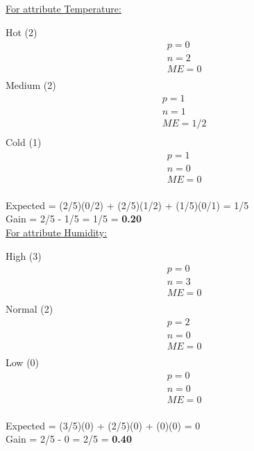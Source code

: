 \documentclass[8pt, fullpage,letterpaper]{article}
\begin{document}
\begin{enumerate}
\begin{enumerate}
\begin{enumerate}
\begin{enumerate}
\begin{itemize}
						\underline {For attribute Temperature:} 
							\vspace{-5pt}
							\begin{multicols}{3}
								Hot (2)
			 						\begin{align*}
									    	& p = 0\\
										& n = 2 \\
									    	& ME = 0\\
								      \end{align*}
								Medium (2)
			 						\begin{align*}
									    	& p = 1\\
										& n = 1 \\
									    	& ME = 1/2\\
								      \end{align*}
								Cold (1)
			 						\begin{align*}
									    	& p = 1\\
										& n = 0 \\
									    	& ME = 0\\
								      \end{align*}
							\end{multicols}
							\vspace{-20pt}
							Expected = (2/5)(0/2) + (2/5)(1/2) + (1/5)(0/1) = 1/5\\
							Gain = 2/5 - 1/5 = 1/5 = {\bf 0.20}\\

						\underline {For attribute Humidity:} 
							\vspace{-5pt}
							\begin{multicols}{3}
								High (3)
			 						\begin{align*}
									    	& p = 0\\
										& n = 3 \\
									    	& ME = 0\\
								      \end{align*}
								Normal (2)
			 						\begin{align*}
									    	& p = 2\\
										& n = 0 \\
									    	& ME = 0\\
								      \end{align*}
								Low (0)
			 						\begin{align*}
									    	& p = 0\\
										& n = 0 \\
									    	& ME = 0\\
								      \end{align*}
							\end{multicols}
							\vspace{-20pt}
							Expected = (3/5)(0) + (2/5)(0) + (0)(0) = 0\\
							Gain = 2/5 - 0 = 2/5 = {\bf 0.40}\\


\end{itemize}
\end{enumerate}
\end{enumerate}
\end{enumerate}
\end{enumerate}
\end{document}
